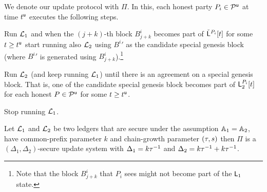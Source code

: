 We denote our update protocol with $\Pi$. In this, each honest party $P_i\in\mathcal{P}^\mathsf{u}$ at time $t^{\mathsf{u}}$ executes the following steps.

\begin{myenumerate}
	\item Run $\mathcal{L}_1$ and when the $(j+k)$-th block $B^i_{j+k}$ becomes part of $\check {\mathsf{L}}^{P_i}[t]$ for some $t\geq t^{\mathsf{u}}$
	start running also $\mathcal{L}_2$ using ${B^i}'$ as the candidate special genesis block (where ${B^i}'$ is generated using $B^i_{j+k}$).\footnote{Note that the block
	 $B^i_{j+k}$ that $P_i$ sees might not become part of the $\mathsf{L}_1$ state.}
	\item Run $\mathcal{L}_2$ (and keep running $\mathcal{L}_1$) until there is an agreement on a special genesis block. That is, one of the candidate special genesis block 
	becomes part of $\mathsf{L}_2^{P_i}[t]$ for each honest $P\in\mathcal{P}^\mathsf{u}$ for some $t\geq t^{\mathsf{u}}$.
	\item Stop running $\mathcal{L}_1$.
\end{myenumerate}



\begin{theorem}\label{th:main}
Let $\mathcal{L}_1$ and $\mathcal{L}_2$ be two ledgers that are secure under the assumption $\mathbb{A}_1=\mathbb{A}_2$, have common-prefix parameter $k$ and chain-growth parameter $(\tau, s)$ then
 $\Pi$ is a $(\Delta_1,\Delta_2)$-secure update system with $\Delta_1=k\tau^{-1}$ and $\Delta_2=k \tau^{-1} + k \tau^{-1}$.
\end{theorem}

